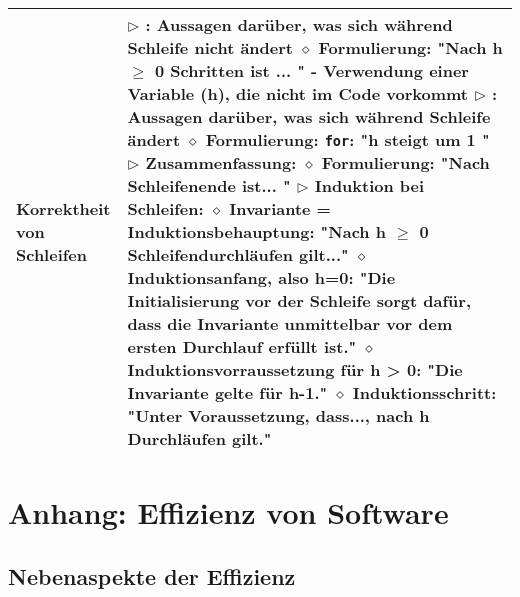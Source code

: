 \begin{longtable}{ | p{} p{} | }
	\makecell[l]{Korrektheit von \\ Schleifen} & \makecell[l]{
	$\rhd$ {\makebox[3.2cm][l]{Schleifeninvariante}}: Aussagen darüber, was sich während Schleife nicht ändert \\
	\hspace{0.4cm} $\diamond$ Formulierung: \string"Nach h $\geq$ 0 Schritten ist ... \string" \\
	\hspace{0.6cm} - Verwendung einer Variable (h), die nicht im Code vorkommt \\
	$\rhd$ {\makebox[3.2cm][l]{Schleifenvariante}}: Aussagen darüber, was sich während Schleife ändert \\
	\hspace{0.4cm} $\diamond$ Formulierung: \texttt{for}: \string"h steigt um 1 \string"
	$\rhd$ Zusammenfassung: \\
	\hspace{0.4cm} $\diamond$ Formulierung: \string"Nach Schleifenende ist... \string" \\
	$\rhd$ Induktion bei Schleifen: \\
	\hspace{0.4cm} $\diamond$ Invariante = Induktionsbehauptung: \string"Nach h $\geq$ 0 Schleifendurchläufen gilt...\string" \\
	\hspace{0.4cm} $\diamond$ Induktionsanfang, also h=0: \string"Die Initialisierung vor der Schleife sorgt dafür, \\ 
	\hspace{0.8cm} dass die Invariante unmittelbar vor dem ersten Durchlauf erfüllt ist.\string" \\
	\hspace{0.4cm} $\diamond$ Induktionsvorraussetzung für h > 0: "Die Invariante gelte für h-1." \\
	\hspace{0.4cm} $\diamond$ Induktionsschritt: \string"Unter Voraussetzung, dass..., nach h Durchläufen gilt.\string"} \\ \hline

	\end{longtable}


\section{Anhang: Effizienz von Software} 

\subsection*{Nebenaspekte der Effizienz} 

